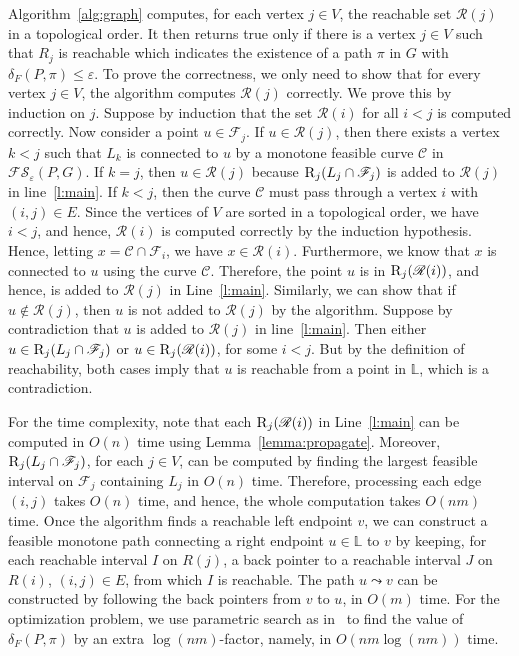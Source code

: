 \documentclass[12pt]{dalthesis}
\def\favoritefont{\bfseries \sffamily}
\def\QED{\ensuremath{{\Box}}}
\def\markatright#1{\leavevmode\unskip\nobreak\quad\hspace*{\fill}{#1}}
\newenvironment{proof}
	{\begin{trivlist}\item[\hskip\labelsep{\favoritefont Proof:}]}
	{\markatright{\QED}\end{trivlist}}
\newcommand{\qed}{}
\newcommand{\lee}{\leqslant}
\newcommand{\eps}{\varepsilon}
\newcommand{\CF}{{\mathscr F}}
\newcommand{\CR}{{\mathscr R}}
\newcommand{\CC}{{\mathscr C}}
\newcommand{\distF}{\delta_F}
\newcommand{\FS}{\mathscr {FS}}
\newcommand{\CL}{{\mathbb L}}
\newcommand{\F}{\CF}
\newcommand{\R}{\CR}
\newcommand{\RE}{\mbox{\sc R}}
\newcommand{\reach}{\leadsto}
\begin{document}
\begin{proof}
	Algorithm~\ref{alg:graph} computes, for each vertex $j \in V$,
	the reachable set $\R(j)$ in a topological order.
	It then returns true only if there is a vertex $j \in V$ such that $R_j$ is reachable
	which indicates the existence of a path $\pi$ in $G$ with $\distF(P, \pi) \lee \eps$.
	To prove the correctness, we only need to show that 
	for every vertex $j \in V$, the algorithm computes $\R(j)$ correctly.
	We prove this by induction on $j$.
	Suppose by induction that the set $\R(i)$
	for all $i < j$ is computed correctly.
	Now consider a point $u \in \F_j$.
	If $u \in \R(j)$, then there exists a vertex $k < j$ such that
	$L_k$ is connected to $u$ by a monotone feasible curve $\CC$ in $\FS_\eps(P,G)$.
	If $k=j$, then $u \in \R(j)$ because
	$\RE_j(L_j \cap \F_j)$ is added to $\R(j)$ in line~\ref{l:main}.
	If $k<j$, then the curve $\CC$ must pass through a vertex $i$ with $(i,j) \in E$.
	Since the vertices of $V$ are sorted in a topological order,
	we have $i < j$, and hence, $\R(i)$ is computed correctly by the induction hypothesis.
	Hence, letting $x = \CC \cap \F_i$, we have $x \in \R(i)$.
	Furthermore, we know that $x$ is connected to $u$ using the curve $\CC$.
	Therefore, the point $u$ is in $\RE_j(\R(i))$,
	and hence, is added to $\R(j)$ in Line~\ref{l:main}.
	Similarly, we can show that if $u \not\in \R(j)$,
	then $u$ is not added to $\R(j)$ by the algorithm.
	Suppose by contradiction that $u$ is added to $\R(j)$ in line~\ref{l:main}.
	Then either $u \in \RE_j(L_j \cap \F_j)$ or
	$u \in \RE_j(\R(i))$, for some $i < j$.
	But by the definition of reachability, both cases imply that 
	$u$ is reachable from a point in $\CL$,
	which is a contradiction.
	
	For the time complexity, 
	note that each $\RE_j(\R(i))$ in Line~\ref{l:main} can be computed in 
	$O(n)$ time using Lemma~\ref{lemma:propagate}. 
	Moreover, $\RE_j(L_j \cap \F_j)$, for each $j \in V$, can be computed
	by finding the largest feasible interval on $\F_j$ containing $L_j$
	in $O(n)$ time.
	Therefore, processing each edge $(i,j)$ takes $O(n)$ time,
	and hence, the whole computation takes $O(nm)$ time.
	Once the algorithm finds a reachable left endpoint $v$,
	we can construct a feasible monotone path connecting a right endpoint $u \in \CL$ to $v$
	by keeping, for each reachable interval $I$ on $R(j)$, a back pointer to a reachable interval $J$ on $R(i)$, $(i, j) \in E$,
	from which $I$ is reachable. 
	The path $u \reach v$ can be constructed 
	by following the back pointers from $v$ to $u$, in $O(m)$ time.
	For the optimization problem, we use parametric search as in~\cite{AltERW03a,AltG95}
	to find the value of $\distF(P, \pi)$ by an extra $\log(nm)$-factor,
	namely, in $O(nm \log (nm))$ time.
	\qed
\end{proof}
\end{document}
